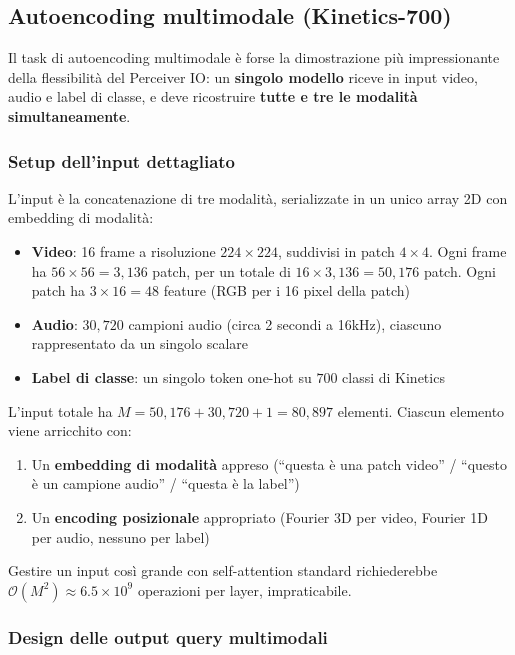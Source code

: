 \documentclass[12pt,a4paper]{article}
\begin{document}
\subsection{Autoencoding multimodale (Kinetics-700)}

Il task di autoencoding multimodale \`e forse la dimostrazione pi\`u impressionante della flessibilit\`a del Perceiver IO: un \textbf{singolo modello} riceve in input video, audio e label di classe, e deve ricostruire \textbf{tutte e tre le modalit\`a simultaneamente}.

\subsubsection{Setup dell'input dettagliato}

L'input \`e la concatenazione di tre modalit\`a, serializzate in un unico array 2D con embedding di modalit\`a:
\begin{itemize}
    \item \textbf{Video}: 16 frame a risoluzione $224 \times 224$, suddivisi in patch $4 \times 4$. Ogni frame ha $56 \times 56 = 3{,}136$ patch, per un totale di $16 \times 3{,}136 = 50{,}176$ patch. Ogni patch ha $3 \times 16 = 48$ feature (RGB per i 16 pixel della patch)
    \item \textbf{Audio}: $30{,}720$ campioni audio (circa 2 secondi a 16kHz), ciascuno rappresentato da un singolo scalare
    \item \textbf{Label di classe}: un singolo token one-hot su $700$ classi di Kinetics
\end{itemize}

L'input totale ha $M = 50{,}176 + 30{,}720 + 1 = 80{,}897$ elementi. Ciascun elemento viene arricchito con:
\begin{enumerate}
    \item Un \textbf{embedding di modalit\`a} appreso (``questa \`e una patch video'' / ``questo \`e un campione audio'' / ``questa \`e la label'')
    \item Un \textbf{encoding posizionale} appropriato (Fourier 3D per video, Fourier 1D per audio, nessuno per label)
\end{enumerate}

Gestire un input cos\`i grande con self-attention standard richiederebbe $\mathcal{O}(M^2) \approx 6.5 \times 10^9$ operazioni per layer, impraticabile.

\subsubsection{Design delle output query multimodali}
\end{document}
